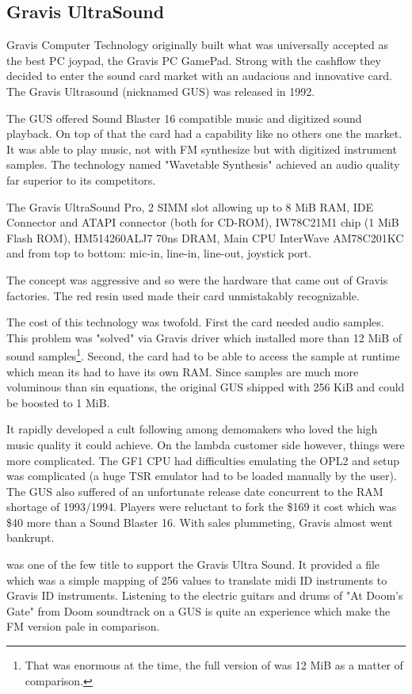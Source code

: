 \subsection{Gravis UltraSound}
Gravis Computer Technology originally built what was universally accepted as the best PC joypad, the Gravis PC GamePad. Strong with the cashflow they decided to enter the sound card market with an audacious and innovative card. The Gravis Ultrasound (nicknamed GUS) was released in 1992.\\
\par
The GUS offered Sound Blaster 16 compatible music and digitized sound playback. On top of that the card had a capability like no others one the market. It was able to play music, not with FM synthesize but with digitized instrument samples. The technology named "Wavetable Synthesis" achieved an audio quality far superior to its competitors.\\


\par
The Gravis UltraSound Pro,  2 SIMM slot allowing up to 8 MiB RAM,  IDE Connector and  ATAPI connector (both for CD-ROM),  IW78C21M1 chip (1 MiB Flash ROM),  HM514260ALJ7 70ns DRAM,  Main CPU InterWave AM78C201KC and  from top to bottom: mic-in, line-in, line-out, joystick port.
\par
The concept was aggressive and so were the hardware that came out of Gravis factories. The red resin used made their card unmistakably recognizable.\\
\par
The cost of this technology was twofold. First the card needed audio samples. This problem was "solved" via Gravis driver which installed more than 12 MiB of sound samples\footnote{That was enormous at the time, the full version of \doom was 12 MiB as a matter of comparison.}. Second, the card had to be able to access the sample at runtime which mean its had to have its own RAM. Since samples are much more voluminous than sin equations, the original GUS shipped with 256 KiB and could be boosted to 1 MiB.\\
\par
It rapidly developed a cult following among demomakers who loved the high music quality it could achieve. On the lambda customer side however, things were more complicated. The GF1 CPU had difficulties emulating the OPL2 and setup was complicated (a huge TSR emulator had to be loaded manually by the user). The GUS also suffered of an unfortunate release date concurrent to the RAM shortage of 1993/1994. Players were reluctant to fork the \$169 it cost which was \$40 more than a Sound Blaster 16. With sales plummeting, Gravis almost went bankrupt.\\
\par
 \doom was one of the few title to support the Gravis Ultra Sound. It provided a  file which was a simple mapping of 256 values to translate midi ID instruments to Gravis ID instruments. Listening to the electric guitars and drums of "At Doom's Gate" from Doom soundtrack on a GUS is quite an experience which make the FM version pale in comparison.